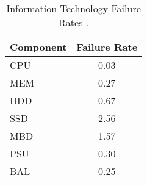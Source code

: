 \begin{table}[h]
\centering
\begin{tabular}{|l|c|}
\hline
    \bf{Component} & \bf{Failure Rate}  \\ \hline
    CPU &         0.03\\ \hline
    MEM &         0.27\\ \hline
    HDD &         0.67\\ \hline
    SSD &         2.56\\ \hline
    MBD &         1.57\\ \hline
    PSU &         0.30\\ \hline
    BAL &         0.25\\ \hline
\end{tabular}
\caption{Information Technology Failure Rates \cite{barroso18, kogge08, srinivasa04}.}
\label{tab:it_failure_rates}
\end{table}